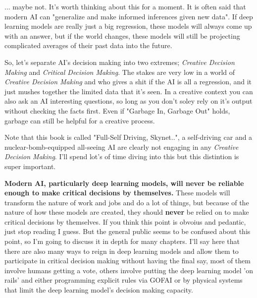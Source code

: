 ... maybe not. It's worth thinking about this for a moment. It is often said that modern AI can "generalize and make informed inferences given new data". If deep learning models are really just a big regression, these models will always come up with an answer, but if the world changes, these models will still be projecting complicated averages of their past data into the future. 

So, let's separate AI's decision making into two extremes; \textit{Creative Decision Making} and \textit{Critical Decision Making}. The stakes are very low in a world of \textit{Creative Decision Making} and who gives a shit if the AI is all a regression, and it just mushes together the limited data that it's seen. In a creative context you can also ask an AI interesting questions, so long as you don't soley rely on it's output without checking the facts first. Even if "Garbage In, Garbage Out" holds, garbage can still be helpful for a creative process. 

Note that this book is called "Full-Self Driving, Skynet..", a self-driving car and a nuclear-bomb-equipped all-seeing AI are clearly not engaging in any \textit{Creative Decision Making}. I'll spend lot's of time diving into this but this distintion is super important. 

\textbf{Modern AI, particularly deep learning models, will never be reliable enough to make critical decisions by themselves.} These models will transform the nature of work and jobs and do a lot of things, but because of the nature of how these models are created, they should \textbf{never} be relied on to make critical decisions by themselves. If you think this point is obvoius and pedantic, just stop reading I guess. But the general public seems to be confused about this point, so I'm going to discuss it in depth for many chapters. I'll say here that there are also many ways to reign in deep learning models and allow them to participate in critical decision making without having the final say, most of them involve humans getting a vote, others involve putting the deep learning model 'on rails' and either programming explicit rules via GOFAI or by physical systems that limit the deep learning model's decision making capacity.


